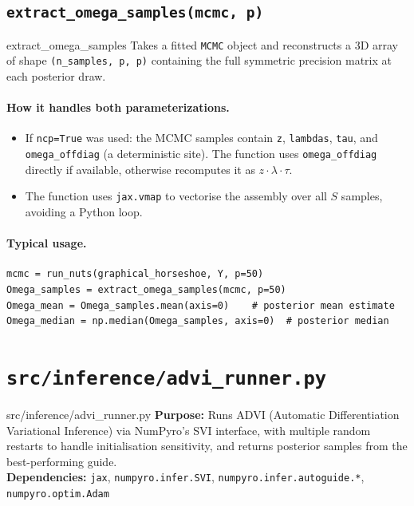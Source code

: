 \documentclass[11pt,a4paper]{article}
\begin{document}
\subsection{\texttt{extract\_omega\_samples(mcmc, p)}}

\begin{funccard}{extract\_omega\_samples}
Takes a fitted \texttt{MCMC} object and reconstructs a 3D array of shape \texttt{(n\_samples, p, p)} containing the full symmetric precision matrix at each posterior draw.
\end{funccard}

\paragraph{How it handles both parameterizations.}
\begin{itemize}[nosep]
  \item If \texttt{ncp=True} was used: the MCMC samples contain \texttt{z}, \texttt{lambdas}, \texttt{tau}, and \texttt{omega\_offdiag} (a deterministic site). The function uses \texttt{omega\_offdiag} directly if available, otherwise recomputes it as $z \cdot \lambda \cdot \tau$.
  \item The function uses \texttt{jax.vmap} to vectorise the assembly over all $S$ samples, avoiding a Python loop.
\end{itemize}

\paragraph{Typical usage.}
\begin{lstlisting}
mcmc = run_nuts(graphical_horseshoe, Y, p=50)
Omega_samples = extract_omega_samples(mcmc, p=50)
Omega_mean = Omega_samples.mean(axis=0)    # posterior mean estimate
Omega_median = np.median(Omega_samples, axis=0)  # posterior median
\end{lstlisting}


\section{\texttt{src/inference/advi\_runner.py}}\label{sec:advi}

\begin{filecard}{src/inference/advi\_runner.py}
\textbf{Purpose:} Runs ADVI (Automatic Differentiation Variational Inference) via NumPyro's SVI interface, with multiple random restarts to handle initialisation sensitivity, and returns posterior samples from the best-performing guide.
\\[0.3em]
\textbf{Dependencies:} \texttt{jax}, \texttt{numpyro.infer.SVI}, \texttt{numpyro.infer.autoguide.*}, \texttt{numpyro.optim.Adam}
\end{filecard}
\end{document}
